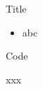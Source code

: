 


\begin{frame}[fragile]{Title}
\begin{itemize}
\item abc
\end{itemize}
\end{frame}

\begin{frame}[fragile]{Code}
\begin{chisel}
xxx
\end{chisel}
\end{frame}
